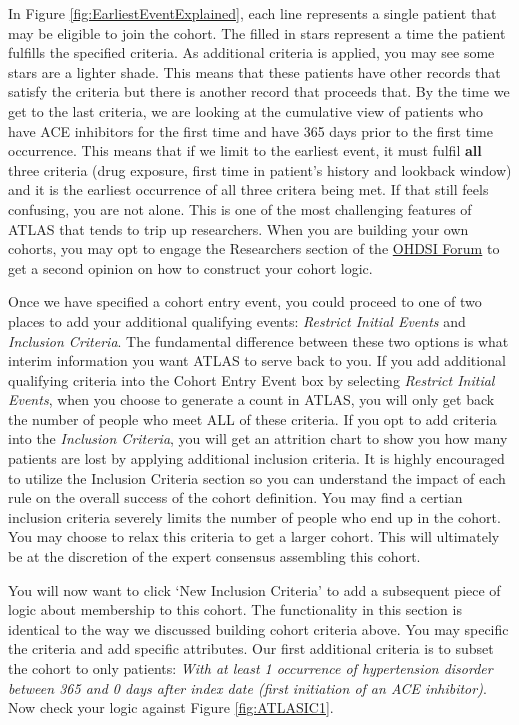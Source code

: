 \documentclass[11pt]{book}
\theoremstyle{definition}
\theoremstyle{definition}
\theoremstyle{definition}
\theoremstyle{remark}
\begin{document}
In Figure \ref{fig:EarliestEventExplained}, each line represents a single patient that may be eligible to join the cohort. The filled in stars represent a time the patient fulfills the specified criteria. As additional criteria is applied, you may see some stars are a lighter shade. This means that these patients have other records that satisfy the criteria but there is another record that proceeds that. By the time we get to the last criteria, we are looking at the cumulative view of patients who have ACE inhibitors for the first time and have 365 days prior to the first time occurrence. This means that if we limit to the earliest event, it must fulfil \textbf{all} three criteria (drug exposure, first time in patient's history and lookback window) and it is the earliest occurrence of all three critera being met. If that still feels confusing, you are not alone. This is one of the most challenging features of ATLAS that tends to trip up researchers. When you are building your own cohorts, you may opt to engage the Researchers section of the \href{http://forums.ohdsi.org}{OHDSI Forum} to get a second opinion on how to construct your cohort logic.

Once we have specified a cohort entry event, you could proceed to one of two places to add your additional qualifying events: \emph{Restrict Initial Events} and \emph{Inclusion Criteria}. The fundamental difference between these two options is what interim information you want ATLAS to serve back to you. If you add additional qualifying criteria into the Cohort Entry Event box by selecting \emph{Restrict Initial Events}, when you choose to generate a count in ATLAS, you will only get back the number of people who meet ALL of these criteria. If you opt to add criteria into the \emph{Inclusion Criteria}, you will get an attrition chart to show you how many patients are lost by applying additional inclusion criteria. It is highly encouraged to utilize the Inclusion Criteria section so you can understand the impact of each rule on the overall success of the cohort definition. You may find a certian inclusion criteria severely limits the number of people who end up in the cohort. You may choose to relax this criteria to get a larger cohort. This will ultimately be at the discretion of the expert consensus assembling this cohort.

You will now want to click `New Inclusion Criteria' to add a subsequent piece of logic about membership to this cohort. The functionality in this section is identical to the way we discussed building cohort criteria above. You may specific the criteria and add specific attributes. Our first additional criteria is to subset the cohort to only patients: \emph{With at least 1 occurrence of hypertension disorder between 365 and 0 days after index date (first initiation of an ACE inhibitor)}. Now check your logic against Figure \ref{fig:ATLASIC1}.
\end{document}

